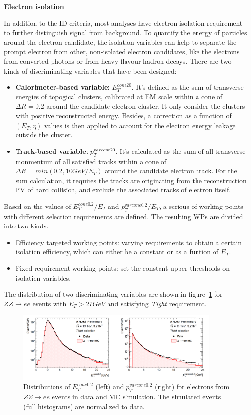 \textbf{Electron isolation}

In addition to the ID criteria, most analyses have electron isolation requirement to further distinguish signal from background.
To quantify the energy of particles around the electron candidate, the isolation variables can help to separate the prompt electron from other, non-isolated electron candidates, like the electrons from converted photons or from heavy flavour hadron decays.
There are two kinds of discriminating variables that have been designed:
\begin{itemize}
	\item \textbf{Calorimeter-based variable:} $E_{T}^{cone20}$. It's defined as the sum of transverse energies of topogical clusters\cite{Aad:2016upy}, calibrated at EM scale within a cone of $\Delta R = 0.2$ around the candidate electron cluster. It only consider the clusters with positive reconstructed energy. Besides, a correction as a function of $(E_{T}, \eta)$ values is then applied to account for the electron energy leakage outside the cluster.
	\item \textbf{Track-based variable:} $p_{T}^{varcone20}$. It's calculated as the sum of all transverse monmentum of all satisfied tracks within a cone of $\Delta R = min(0.2, 10 GeV/E_{T})$ around the candidate electron track. For the sum calculation, it requires the tracks are originating from the reconstruction PV of hard collision, and exclude the associated tracks of electron itself.
\end{itemize}
Based on the values of $E_{T}^{cone0.2}/E_{T}$ and $p_{T}^{varcone0.2}/E_{T}$, a serious of working points with different selection requirements are defined.
The resulting WPs are divided into two kinds:
\begin{itemize}
	\item Efficiency targeted working points: varying requirements to obtain a certain isolation efficiency, which can either be a constant or as a funtion of $E_{T}$.
	\item Fixed requirement working points: set the constant upper thresholds on isolation variables.
\end{itemize}
The distribution of two discriminating variables are shown in figure~\ref{fig:ele_iso} for $ZZ \rightarrow ee$ events with $E_{T} > 27 GeV$ and satisfying \textit{Tight} requirement.
\begin{figure}[!htb]
  \centering
  \includegraphics[width=0.9\textwidth]{figures/Simulation/ele_iso.png}
  \caption{Distributions of $E_{T}^{cone0.2}$ (left) and $p_{T}^{varcone0.2}$ (right) for electrons from $ZZ \rightarrow ee$ events in data and MC simulation. The simulated events (full histograms) are normalized to data.}
  \label{fig:ele_iso}
\end{figure}

